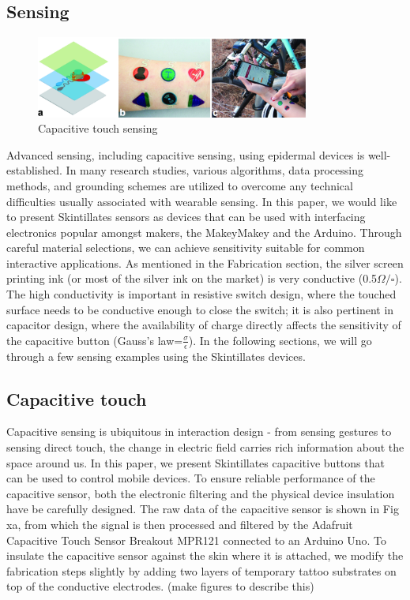 \documentclass{sigchi}
\begin{document}
\subsection{Sensing}
\begin{figure}[!h]
\centering
\includegraphics[width=0.8\textwidth]{figures/Figure7}
\caption{Capacitive touch sensing}
\label{fig:figure7}
\end{figure}
Advanced sensing, including capacitive sensing, using epidermal devices is well-established. In many research studies, various algorithms, data processing methods, and grounding schemes are utilized to overcome any technical difficulties usually associated with wearable sensing. In this paper, we would like to present Skintillates sensors as devices that can be used with interfacing electronics popular amongst makers, the MakeyMakey and the Arduino. Through careful material selections, we can achieve sensitivity suitable for common interactive applications. As mentioned in the Fabrication section, the silver screen printing ink (or most of the silver ink on the market) is very conductive (0.5$\Omega/\square$). The high conductivity is important in resistive switch design, where the touched surface needs to be conductive enough to close the switch; it is also pertinent in capacitor design, where the availability of charge directly affects the sensitivity of the capacitive button (Gauss’s law=$\frac{\sigma}{\epsilon}$). In the following sections, we will go through a few sensing examples using the Skintillates devices. 

\subsection {Capacitive touch}

Capacitive sensing is ubiquitous in interaction design - from sensing gestures to sensing direct touch, the change in electric field carries rich information about the space around us. In this paper, we present Skintillates capacitive buttons that can be used to control mobile devices. To ensure reliable performance of the capacitive sensor, both the electronic filtering and the physical device insulation have be carefully designed. The raw data of the capacitive sensor is shown in Fig xa, from which the signal is then processed and filtered by the Adafruit Capacitive Touch Sensor Breakout MPR121 connected to an Arduino Uno. To insulate the capacitive sensor against the skin where it is attached, we modify the fabrication steps slightly by adding two layers of temporary tattoo substrates on top of the conductive electrodes. (make figures to describe this)
\end{document}
